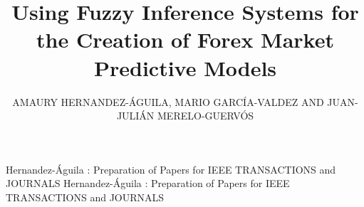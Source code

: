 ﻿\documentclass{ieeeaccess}
\begin{document}

\title{Using Fuzzy Inference Systems for the Creation of Forex Market Predictive Models}
\author{
    \uppercase{Amaury Hernandez-\'{A}guila,
    \uppercase{Mario Garc\'{i}a-Valdez
      and
    Juan-Julián Merelo-Guerv\'{o}s}}}
\address[1]{National Technological Institute of Mexico, Calzada Del Tecnoló\'{o}ico s/n, Fraccionamiento Tomas Aquino, Tijuana, BC 22414 Mexico (e-mail: {amerhag,mario}@tectijuana.edu.mx)}
\address[2]{University of Granada, Campus Aynadamar Daniel Saucedo Aranda s/n, Granada 18071, 80523 Spain (e-mail: jmerelo@geneura.ugr.es)}

\markboth
{Hernandez-\'{A}guila \headeretal: Preparation of Papers for IEEE TRANSACTIONS and JOURNALS}
{Hernandez-\'{A}guila \headeretal: Preparation of Papers for IEEE TRANSACTIONS and JOURNALS}

\end{document}

